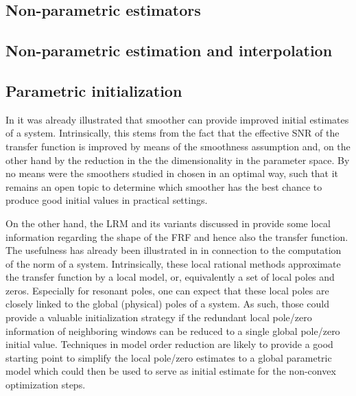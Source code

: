   \subsection{Non-parametric estimators}

  \subsection{Non-parametric estimation and interpolation}

  \subsection{Parametric initialization}
  In  it was already illustrated that smoother can provide improved initial estimates of a system. 
  Intrinsically, this stems from the fact that the effective \gls{SNR} of the transfer function is improved by means of the smoothness assumption and, on the other hand by the reduction in the the dimensionality in the parameter space.
  By no means were the  smoothers studied in  chosen in an optimal way, such that it remains an open topic to determine which smoother has the best chance to produce good initial values in practical settings.

  On the other hand, the \gls{LRM} and its variants discussed in  provide some local information regarding the shape of the \gls{FRF} and hence also the transfer function.
  The usefulness has already been illustrated in  in connection to the computation of the \Hinf norm of a system.
  Intrinsically, these local rational methods approximate the transfer function by a local model, or, equivalently a set of local poles and zeros.
  Especially for resonant poles, one can expect that these local poles are closely linked to the global (physical) poles of a system.
  As such, those could provide a valuable initialization strategy if the redundant local pole/zero information of neighboring windows can be reduced to a single global pole/zero initial value.
  Techniques in model order reduction are likely to provide a good starting point to simplify the local pole/zero estimates to a global parametric model which could then be used to serve as initial estimate for the non-convex optimization steps.
  
